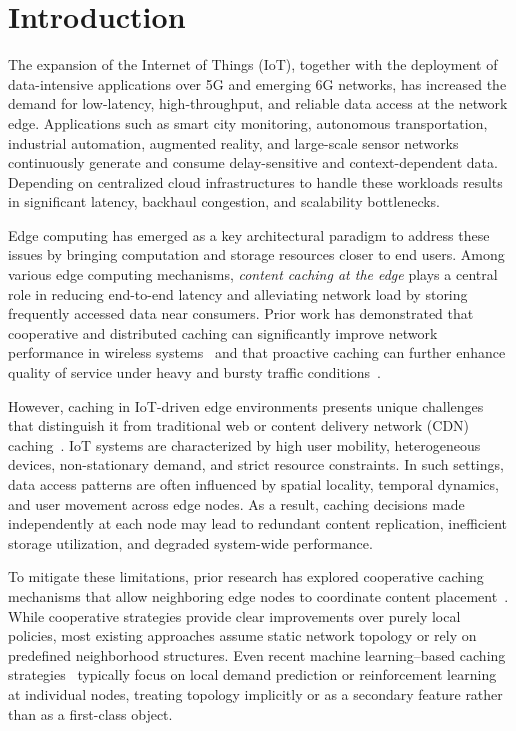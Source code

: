\section{Introduction}

The expansion of the Internet of Things (IoT), together with the deployment of data-intensive applications over 5G and emerging 6G networks, has increased the demand for low-latency, high-throughput, and reliable data access at the network edge. Applications such as smart city monitoring, autonomous transportation, industrial automation, augmented reality, and large-scale sensor networks continuously generate and consume delay-sensitive and context-dependent data. Depending on centralized cloud infrastructures to handle these workloads results in significant latency, backhaul congestion, and scalability bottlenecks.

Edge computing has emerged as a key architectural paradigm to address these issues by bringing computation and storage resources closer to end users. Among various edge computing mechanisms, \emph{content caching at the edge} plays a central role in reducing end-to-end latency and alleviating network load by storing frequently accessed data near consumers. Prior work has demonstrated that cooperative and distributed caching can significantly improve network performance in wireless systems~\cite{Shanmugam2013} and that proactive caching can further enhance quality of service under heavy and bursty traffic conditions~\cite{Bastug2014}.

However, caching in IoT-driven edge environments presents unique challenges that distinguish it from traditional web or content delivery network (CDN) caching~\cite{Podlipnig2003}. IoT systems are characterized by high user mobility, heterogeneous devices, non-stationary demand, and strict resource constraints. In such settings, data access patterns are often influenced by spatial locality, temporal dynamics, and user movement across edge nodes. As a result, caching decisions made independently at each node may lead to redundant content replication, inefficient storage utilization, and degraded system-wide performance.

To mitigate these limitations, prior research has explored cooperative caching mechanisms that allow neighboring edge nodes to coordinate content placement~\cite{Shanmugam2013,Poularakis2014}. While cooperative strategies provide clear improvements over purely local policies, most existing approaches assume static network topology or rely on predefined neighborhood structures. Even recent machine learning–based caching strategies~\cite{Shuja2021JNCA} typically focus on local demand prediction or reinforcement learning at individual nodes, treating topology implicitly or as a secondary feature rather than as a first-class object.

